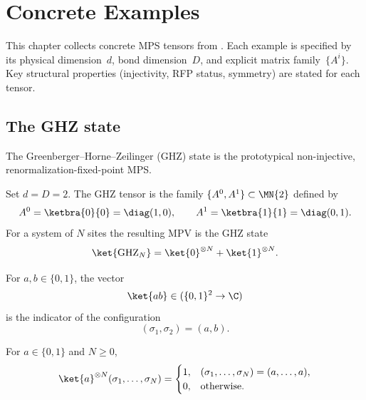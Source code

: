 \chapter{Concrete Examples}\label{ch:examples}

This chapter collects concrete MPS tensors from
\cite[Section~III]{Cirac2021Matrix}. Each example is specified by its
physical dimension~$d$, bond dimension~$D$, and explicit matrix
family~$\{A^i\}$. Key structural properties (injectivity, RFP status,
symmetry) are stated for each tensor.

\section{The GHZ state}\label{sec:ghz}

The Greenberger--Horne--Zeilinger (GHZ) state is the prototypical
non-injective, renormalization-fixed-point MPS.

\begin{definition}\label{def:ghz_tensor}
    \leanok
    Set $d = D = 2$. The GHZ tensor is the family
    $\{A^0, A^1\} \subset \MN{2}$ defined by
    \[
        A^0 = \ketbra{0}{0} = \diag(1,0),
        \qquad
        A^1 = \ketbra{1}{1} = \diag(0,1).
    \]
    For a system of $N$ sites the resulting MPV is the GHZ state
    \[
        \ket{\mathrm{GHZ}_N}
        = \ket{0}^{\otimes N} + \ket{1}^{\otimes N}.
    \]
\end{definition}

\begin{definition}\label{def:two_site_ket}
    \leanok
    For $a,b\in\{0,1\}$, the vector
    \[
        \ket{ab}\in(\{0,1\}^{2}\to\C)
    \]
    is the indicator of the configuration
    \[
        (\sigma_1,\sigma_2)=(a,b).
    \]
\end{definition}

\begin{definition}\label{def:constant_ket}
    \leanok
    For $a\in\{0,1\}$ and $N\ge0$,
    \[
        \ket{a}^{\otimes N}(\sigma_1,\ldots,\sigma_N)
        =
        \begin{cases}
            1, & (\sigma_1,\ldots,\sigma_N)=(a,\ldots,a),\\
            0, & \text{otherwise}.
        \end{cases}
    \]
\end{definition}

